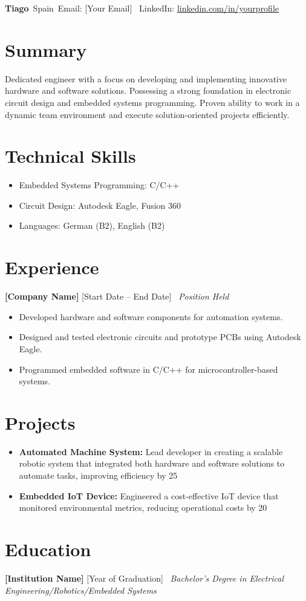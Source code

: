 \documentclass[a4paper,10pt]{article}
\begin{document}
\parindent0pt

\begin{center}
    {\LARGE \textbf{Tiago}}\
    Spain\
    Email: [Your Email] \
    LinkedIn: \href{https://linkedin.com/in/yourprofile}{linkedin.com/in/yourprofile} \
\end{center}

\section*{Summary}
Dedicated engineer with a focus on developing and implementing innovative hardware and software solutions. Possessing a strong foundation in electronic circuit design and embedded systems programming. Proven ability to work in a dynamic team environment and execute solution-oriented projects efficiently.

\section*{Technical Skills}
\begin{itemize}[leftmargin=*]
    \item Embedded Systems Programming: C/C++
    \item Circuit Design: Autodesk Eagle, Fusion 360
    \item Languages: German (B2), English (B2)
\end{itemize}

\section*{Experience}
\noindent
\textbf{[Company Name]} \hfill [Start Date – End Date] \
\textit{Position Held} \
\begin{itemize}[leftmargin=*]
    \item Developed hardware and software components for automation systems.
    \item Designed and tested electronic circuits and prototype PCBs using Autodesk Eagle.
    \item Programmed embedded software in C/C++ for microcontroller-based systems.
\end{itemize}

\section*{Projects}
\begin{itemize}[leftmargin=*]
    \item \textbf{Automated Machine System:} Lead developer in creating a scalable robotic system that integrated both hardware and software solutions to automate tasks, improving efficiency by 25%
    \item \textbf{Embedded IoT Device:} Engineered a cost-effective IoT device that monitored environmental metrics, reducing operational costs by 20%
\end{itemize}

\section*{Education}
\noindent
\textbf{[Institution Name]} \hfill [Year of Graduation] \
\textit{Bachelor’s Degree in Electrical Engineering/Robotics/Embedded Systems} \
\end{document}
